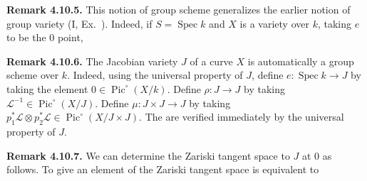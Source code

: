 {\medskip
\noindent\hypertarget{result-IV-4.10.5}{}\textbf{Remark 4.10.5.} This notion of group scheme generalizes the earlier notion of group variety (I, Ex.~). Indeed, if $S=\operatorname{Spec}k$ and $X$ is a variety over $k$, taking $e$ to be the $0$ point, 

\medskip
\noindent\hypertarget{result-IV-4.10.6}{}\textbf{Remark 4.10.6.} The Jacobian variety $J$ of a curve $X$ is automatically a group scheme over $k$. Indeed, using the universal property of $J$, define $e\colon\operatorname{Spec}k\to J$ by taking the element $0\in\operatorname{Pic}^{\circ}(X/k)$. Define $\rho\colon J\to J$ by taking $\mathcal L^{-1}\in\operatorname{Pic}^{\circ}(X/J)$. Define $\mu\colon J\times J\to J$ by taking $p_1^*\mathcal L\otimes p_2^*\mathcal L\in\operatorname{Pic}^{\circ}(X/J\times J)$. The  are verified immediately by the universal property of $J$.

\medskip
\noindent\hypertarget{result-IV-4.10.7}{}\textbf{Remark 4.10.7.} We can determine the Zariski tangent space to $J$ at $0$ as follows. To give an element of the Zariski tangent space is equivalent to
}
